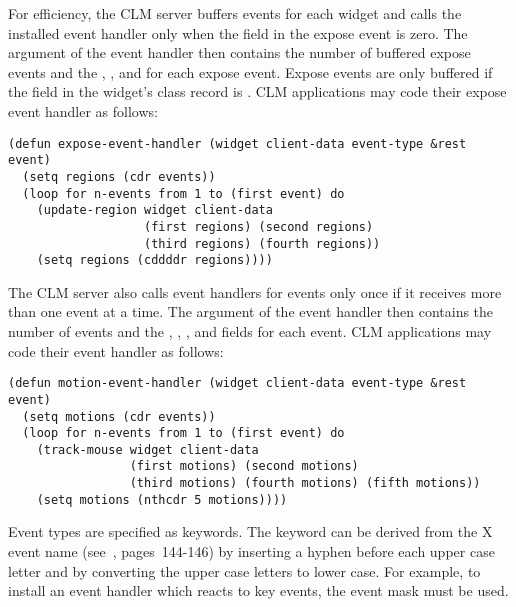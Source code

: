 For efficiency, the CLM server buffers  events for each widget
and calls the installed event handler only when the  field in the
expose event is zero.  The  argument of the event handler then
contains the number of buffered expose events and the , ,
 and  for each expose event.  Expose events are only
buffered if the  field in the widget's class record is
. CLM applications may code their expose event handler as follows:

\begin{verbatim}
(defun expose-event-handler (widget client-data event-type &rest event)
  (setq regions (cdr events))
  (loop for n-events from 1 to (first event) do
    (update-region widget client-data
                   (first regions) (second regions)
                   (third regions) (fourth regions))
    (setq regions (cddddr regions))))
\end{verbatim}

The CLM server also calls event handlers for  events only
once if it receives more than one  event at a time. The 
 argument of the event handler then contains the number of
 events and the , , , 
 and  fields for each  event.
CLM applications may code their  event handler as follows:

\begin{verbatim}
(defun motion-event-handler (widget client-data event-type &rest event)
  (setq motions (cdr events))
  (loop for n-events from 1 to (first event) do
    (track-mouse widget client-data
                 (first motions) (second motions)
                 (third motions) (fourth motions) (fifth motions))
    (setq motions (nthcdr 5 motions))))
\end{verbatim}

Event types are specified as keywords.  The keyword can be derived from the X
event name (see~\cite{xlib}, pages~144-146) by inserting a hyphen before each
upper case letter and by converting the upper case letters to lower case.  For
example, to install an event handler which reacts to key events, the event mask
 must be used. 

